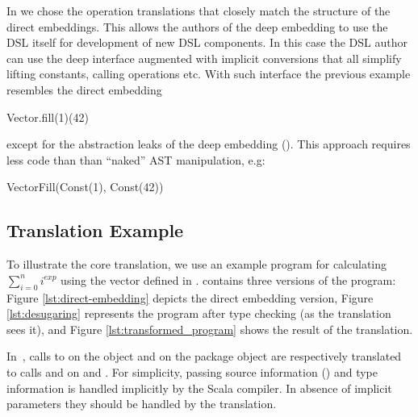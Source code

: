 In \yy we chose the operation translations that closely match the structure of
 the direct embeddings. This allows the authors of the deep embedding to use the
 DSL itself for development of new DSL components. In this case the DSL author can use
 the deep interface augmented with implicit conversions that all simplify lifting constants,
 calling operations etc. With such interface the previous example resembles the direct embedding\begin{lstparagraph}
Vector.fill(1)(42)
\end{lstparagraph}
except for the abstraction leaks of the deep embedding ().
This approach requires less code than than ``naked'' AST manipulation, e.g:\begin{lstparagraph}
VectorFill(Const(1), Const(42))
\end{lstparagraph}


\subsection{Translation Example}
\label{sct:translation-example}

To illustrate the core translation, we use an example program for calculating $\sum_{i=0}^n i^{exp}$ using the vector \edsl defined in .  contains three versions of the program: Figure \ref{lst:direct-embedding} depicts the direct embedding version, Figure \ref{lst:desugaring} represents the program after type checking (as the translation sees it), and Figure \ref{lst:transformed_program} shows the result of the translation.

 In~, calls to  on the object
  and  on the package object 
 are respectively translated to calls  and  on
  and . For simplicity, passing source
 information () and type information  is
 handled implicitly by the Scala compiler. In absence of implicit parameters
 they should be handled by the translation.

